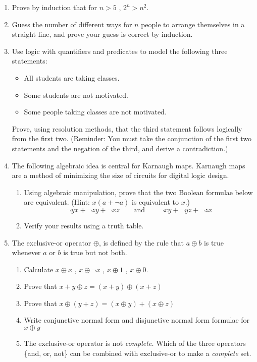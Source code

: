 \documentclass{article}
\begin{document}
\begin{enumerate}
\item
    Prove by induction that for $n > 5 $ , $2^{n} > n^{2}$.


\item
    Guess the number of different ways for $n$ people to arrange
    themselves in a straight line, and prove your guess is correct
    by induction.


\item
    Use logic with quantifiers and predicates to model the following
    three statements:
    \begin{itemize}
    \item All students are taking classes.
    \item Some students are not motivated.
    \item Some people taking classes are not motivated.
    \end{itemize}
    Prove, using resolution methods, that the third statement follows
    logically from the first two. (Reminder: You must take the conjunction
    of the first two statements and the negation of the third, and
    derive a contradiction.)

\item    The following algebraic idea is central for Karnaugh maps.
    Karnaugh maps are a method of minimizing the size of circuits for
    digital logic design.

    \begin{enumerate}
    \item
    Using algebraic manipulation, prove that the two Boolean formulae
    below are equivalent. (Hint: $x(a+ \neg a)$ is equivalent
    to $x$.)
    \[
    \neg yx + \neg zy + \neg xz \qquad \textrm{and} \qquad
    \neg xy + \neg yz + \neg zx
    \]
    \item Verify your results using a truth table.
    \end{enumerate}

\item
    The exclusive-or operator $\oplus$, is defined by the rule that $a \oplus
    b$
    is true whenever $a$ or $b$ is true but not both.
    \begin{enumerate}
    \item Calculate $x \oplus x$ , $x \oplus \neg x$ ,
    $x \oplus 1$ , $x \oplus 0$.\\
    \item Prove that $x + y \oplus z = (x+ y) \oplus (x+ z)$\\
    \item Prove that $x  \oplus (y +  z) = ( x  \oplus y) + ( x  \oplus z)$\\
    \item
    Write conjunctive normal form and disjunctive normal form formulae
    for  $x  \oplus  y$\\
    \item The exclusive-or operator is not  {\em complete.} Which of the
    three operators \{and, or, not\} can be combined with exclusive-or
    to make a  {\em complete} set.
    \end{enumerate}


\end{enumerate}
\end{document}

